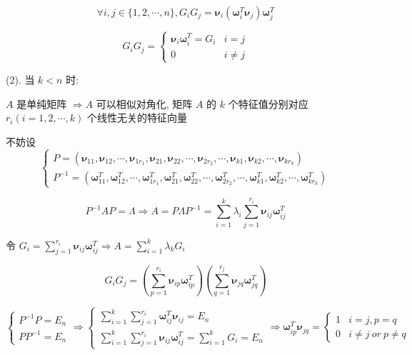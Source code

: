 \begin{anymark}[证明]
	$$\forall i,j\in \{1,2,\cdots,n\}, G_{i}G_{j} = \boldsymbol{\nu}_{i}(\boldsymbol{\omega}_{i}^{T}\boldsymbol{\nu}_{j})\boldsymbol{\omega}_{j}^{T}$$

	$$G_{i}G_{j} = 
	\begin{cases}
		\boldsymbol{\nu}_{i}\boldsymbol{\omega}_{i}^{T} = G_{i} & i = j\\
		0 & i \neq j
	\end{cases}$$
	
	(2). 当 $k < n$ 时:

	$A$ 是单纯矩阵 $\Rightarrow A$ 可以相似对角化, 矩阵 $A$ 的 $k$ 个特征值分别对应 $r_{i}(i = 1,2,\cdots,k)$ 个线性无关的特征向量

	不妨设
	$$\begin{cases}
	  P = (\boldsymbol{\nu}_{11},\boldsymbol{\nu}_{12},\cdots,\boldsymbol{\nu}_{1r_{1}},
	  \boldsymbol{\nu}_{21},\boldsymbol{\nu}_{22},\cdots,\boldsymbol{\nu}_{2r_{2}},\cdots,
	  \boldsymbol{\nu}_{k1},\boldsymbol{\nu}_{k2},\cdots,\boldsymbol{\nu}_{kr_{k}})\\
	  P^{-1} = (\boldsymbol{\omega}_{11}^{T},\boldsymbol{\omega}_{12}^{T},\cdots,\boldsymbol{\omega}_{1r_{1}}^{T},
	  \boldsymbol{\omega}_{21}^{T},\boldsymbol{\omega}_{22}^{T},\cdots,\boldsymbol{\omega}_{2r_{2}}^{T},\cdots,
	  \boldsymbol{\omega}_{k1}^{T},\boldsymbol{\omega}_{k2}^{T},\cdots,\boldsymbol{\omega}_{kr_{k}}^{T})
	\end{cases}$$ 
	
	$$P^{-1}AP = \varLambda\Rightarrow A = P\varLambda P^{-1} = \sum\limits_{i = 1}^{k}\lambda_{i}\sum\limits_{j = 1}^{r_{i}}\boldsymbol{\nu}_{ij}\boldsymbol{\omega}_{ij}^{T}$$
	
	令 $G_{i} = \sum\limits_{j = 1}^{r_{i}}\boldsymbol{\nu}_{ij}\boldsymbol{\omega}_{ij}^{T} \Rightarrow A = \sum\limits_{i = 1}^{k}\lambda_{k}G_{i}$

	$$G_{i}G_{j} = \left(\sum\limits_{p = 1}^{r_{i}}\boldsymbol{\nu}_{ip}\boldsymbol{\omega}_{ip}^{T}\right)\left(\sum\limits_{q = 1}^{r_{j}}\boldsymbol{\nu}_{jq}\boldsymbol{\omega}_{jq}^{T}\right)$$

	$$\begin{cases}
	  P^{-1} P = E_{n}\\
	  P P^{-1} = E_{n}
	\end{cases}\Rightarrow
	\begin{cases}
	  \sum\limits_{i = 1}^{k}\sum\limits_{j = 1}^{r_{i}}\boldsymbol{\omega}_{ij}^{T}\boldsymbol{\nu}_{ij} = E_{n}\\
	  \sum\limits_{i = 1}^{k}\sum\limits_{j = 1}^{r_{i}}\boldsymbol{\nu}_{ij}\boldsymbol{\omega}_{ij}^{T} = \sum\limits_{i = 1}^{k}G_{i} = E_{n}
	\end{cases}\Rightarrow
	\boldsymbol{\omega}_{ip}^{T}\boldsymbol{\nu}_{jq} =
	\begin{cases}
	   1 & i = j, p = q\\
	   0 & i \neq j\ or\  p \neq q
	\end{cases}$$


\end{anymark}

